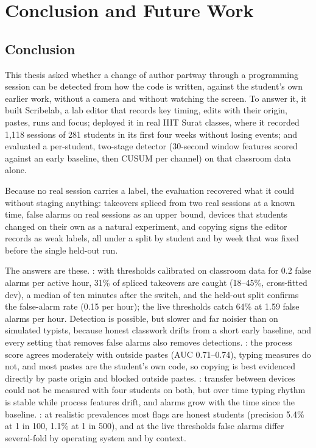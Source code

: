 \chapter{Conclusion and Future Work}
\label{ch:conclusion}
\section{Conclusion}
\label{sec:conclusion}
This thesis asked whether a change of author partway through a programming
session can be detected from how the code is written, against the student's own
earlier work, without a camera and without watching the screen. To answer it, it
built Scribelab, a lab editor that records key timing, edits with their origin,
pastes, runs and focus; deployed it in real IIIT Surat classes, where it recorded
1,118 sessions of 281 students in its first four weeks without losing events; and
evaluated a per-student, two-stage detector (30-second window features scored
against an early baseline, then CUSUM per channel) on that classroom data alone.

Because no real session carries a label, the evaluation recovered what it could
without staging anything: takeovers spliced from two real sessions at a known
time, false alarms on real sessions as an upper bound, devices that students
changed on their own as a natural experiment, and copying signs the editor
records as weak labels, all under a split by student and by week that was fixed
before the single held-out run.

The answers are these. : with thresholds calibrated on classroom data for
0.2 false alarms per active hour, 31\% of spliced takeovers are caught (18--45\%,
cross-fitted dev), a median of ten minutes after the switch, and the held-out
split confirms the false-alarm rate (0.15 per hour); the live thresholds catch
64\% at 1.59 false alarms per hour. Detection is possible, but slower and far
noisier than on simulated typists, because honest classwork drifts from a short
early baseline, and every setting that removes false alarms also removes
detections. : the process score agrees moderately with outside pastes (AUC
0.71--0.74), typing measures do not, and most pastes are the student's own code,
so copying is best evidenced directly by paste origin and blocked outside
pastes. : transfer between devices could not be measured with four
students on both, but over time typing rhythm is stable while process features
drift, and alarms grow with the time since the baseline. : at realistic
prevalences most flags are honest students (precision 5.4\% at 1 in 100, 1.1\%
at 1 in 500), and at the live thresholds false alarms differ several-fold by
operating system and by context.

